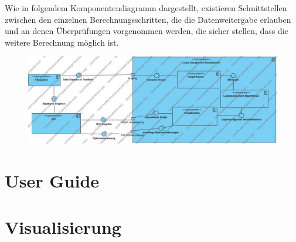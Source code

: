 \documentclass[12pt]{book}
\begin{document}
    Wie in folgendem Komponentendiagramm dargestellt, existieren Schnittstellen zwischen den einzelnen Berechnungsschritten, die die Datenweitergabe erlauben und an denen Überprüfungen vorgenommen werden, die sicher stellen, dass die weitere Berechnung möglich ist.
    
    
    \begin{figure}[ht!]
        \centering
        \includegraphics[width=\textwidth]{images/Component_Diagram1.jpg}
    \end{figure}
    
    
    
    
    
    
    
    
    
    
    
    \section*{User Guide}
    
    
    
    
    
    \section*{Visualisierung}
    
    
    
    
    
    
    
\end{document}
